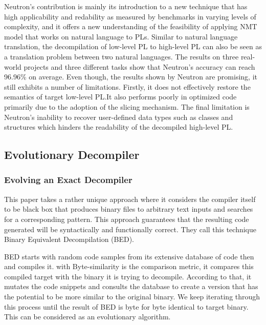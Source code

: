 \documentclass[conference,a4paper]{IEEEtran}
\begin{document}
Neutron’s contribution is mainly its introduction to a new technique that has high applicability and redability as measured by benchmarks in varying levels of complexity, and it offers a new understanding of the feasibility of applying NMT model that works on natural language to PLs.
Similar to natural language translation, the decompilation of low-level PL to high-level PL can also be seen as a translation problem between two natural languages.
The results on three real-world projects and three different tasks show that Neutron’s accuracy can reach 96.96\% on average.
Even though, the results shown by Neutron are promising, it still exhibits a number of limitations. Firstly, it does not effectively restore the semantics of target low-level PL.It also performs poorly in optimized code primarily due to the adoption of the slicing mechanism.
The final limitation is Neutron’s inability to recover user-defined data types such as classes and structures which hinders the readability of the decompiled high-level PL.
 \cite{liang_neutron_2021}

\subsection{Evolutionary Decompiler}

\subsubsection{Evolving an Exact Decompiler}

This paper \cite{schulte_evolving_2018} takes a rather unique approach where it considers the compiler itself to be black box that produces binary files to arbitrary text inputs and searches for a corresponding pattern.
This approach guarantees that the resulting code generated will be syntactically and functionally correct.
They call this technique Binary Equivalent Decompilation (BED).

BED starts with random code samples from its extensive database of code then and compiles it.
with Byte-similarity is the comparison metric, it compares this compiled target with the binary it is trying to decompile.
According to that, it mutates the code snippets and consults the database to create a version that has the potential to be more similar to the original binary.
We keep iterating through this process until the result of BED is byte for byte identical to target binary.
This can be considered as an evolutionary algorithm.
\end{document}
